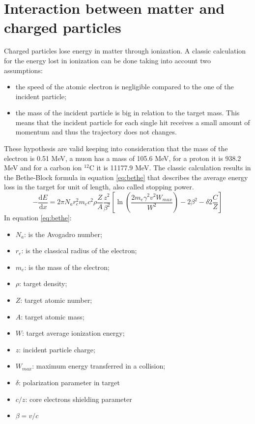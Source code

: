 \section{Interaction between matter and charged particles}
Charged particles
lose energy in matter through ionization.
A classic calculation for the energy lost in ionization can be done taking into account two assumptions:
\begin{itemize}
	\item the speed of the atomic electron is negligible compared to the one of the incident particle;
	\item the mass of the incident particle is big in relation to the target mass.
	This means that the incident particle for each single hit receives a small amount of momentum and thus the trajectory does not changes.  
\end{itemize}
\noindent These hypothesis are valid keeping into consideration that the mass of the electron is 0.51 MeV, a muon has a mass of 105.6 MeV, for a proton it is 938.2 MeV and for a carbon ion ${}^{12}$C it is 11177.9 MeV.
\newline
The classic calculation results in the Bethe-Block formula in equation \ref{eq:bethe} that describes the average energy loss in the target for unit of length, also called stopping power\cite{PDG}.
\begin{equation}\label{eq:bethe}
	-\dfrac{\mathrm dE}{\mathrm dx} = 2 \pi N_{a} r_{e}^{2} m_{e} c^{2} \rho \dfrac{Z}{A}  \dfrac{z^{2}}{\beta^{2}}\left[\ln\left(\dfrac{2m_{e} \gamma ^{2} v^{2} W_{max}}{W^{2}}\right) - 2\beta^{2} - \delta 2\frac{C}{Z}\right]
\end{equation}
\noindent In equation \ref{eq:bethe}:
\begin{itemize}
	\item $N_a$: is the Avogadro number;
	\item $r_e$: is the classical radius of the electron;
	\item $m_e$: is the mass of the electron;
	\item $\rho$: target density;
	\item $Z $: target atomic number;
	\item $A $: target atomic mass;
	\item $W $: target average ionization energy;
	\item $z $: incident particle charge;
	\item $W_{max} $: maximum energy transferred in a collision; 
	\item $\delta $: polarization parameter in target
	\item $c/z $: core electrons shielding parameter 
	\item $\beta = v/c $
\end{itemize}
